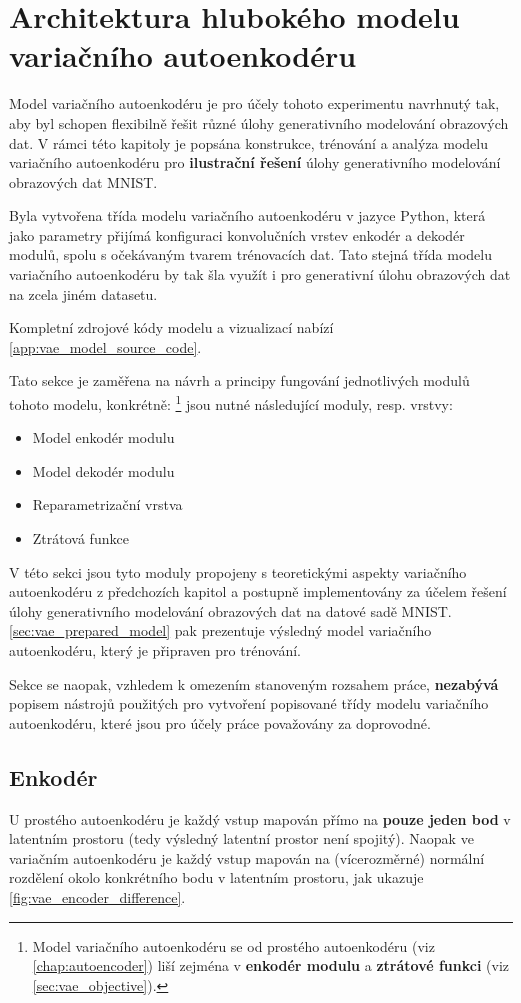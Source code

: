 \section{Architektura hlubokého modelu variačního autoenkodéru}
\label{sec:vae_model_architecture}
Model variačního autoenkodéru je pro účely tohoto experimentu navrhnutý tak, aby byl schopen flexibilně řešit různé úlohy generativního modelování obrazových dat.
V rámci této kapitoly je popsána konstrukce, trénování a analýza modelu variačního autoenkodéru pro \textbf{ilustrační řešení} úlohy generativního modelování obrazových dat MNIST.

Byla vytvořena třída modelu variačního autoenkodéru v jazyce Python, která jako parametry přijímá konfiguraci konvolučních vrstev enkodér a dekodér modulů, spolu s očekávaným tvarem trénovacích dat.
Tato stejná třída modelu variačního autoenkodéru by tak šla využít i pro generativní úlohu obrazových dat na zcela jiném datasetu.

Kompletní zdrojové kódy modelu a vizualizací nabízí \autoref{app:vae_model_source_code}.

Tato sekce je zaměřena na návrh a principy fungování jednotlivých modulů tohoto modelu, konkrétně:
\footnote{Model variačního autoenkodéru se od prostého autoenkodéru (viz \autoref{chap:autoencoder}) liší zejména v \textbf{enkodér modulu} a \textbf{ztrátové funkci} (viz \autoref{sec:vae_objective}).} jsou nutné následující moduly, resp. vrstvy:
\begin{itemize}
    \item Model enkodér modulu
    \item Model dekodér modulu
    \item Reparametrizační vrstva
    \item Ztrátová funkce
\end{itemize}

V této sekci jsou tyto moduly propojeny s teoretickými aspekty variačního autoenkodéru z předchozích kapitol a postupně implementovány za účelem řešení úlohy generativního modelování obrazových dat na datové sadě MNIST.
\autoref{sec:vae_prepared_model} pak prezentuje výsledný model variačního autoenkodéru, který je připraven pro trénování.

Sekce se naopak, vzhledem k omezením stanoveným rozsahem práce, \textbf{nezabývá} popisem nástrojů použitých pro vytvoření popisované třídy modelu variačního autoenkodéru, které jsou pro účely práce považovány za doprovodné.

\subsection{Enkodér}
\label{sec:vae_model_encoder}
U prostého autoenkodéru je každý vstup mapován přímo na \textbf{pouze jeden bod} v latentním prostoru (tedy výsledný latentní prostor není spojitý).
Naopak ve variačním autoenkodéru je každý vstup mapován na (vícerozměrné) normální rozdělení okolo konkrétního bodu v latentním prostoru, jak ukazuje \autoref{fig:vae_encoder_difference}.

